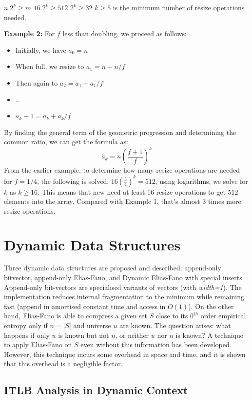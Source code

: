 \par
$ n.2^k \geq m$\newline
$ 16.2^k \geq 512$\newline
$2^k \geq 32$\newline
$k \geq 5$ is the minimum number of resize operations needed.
\par
\textbf{Example 2:} For $f$ less than doubling, we proceed as follows:
\begin{itemize}
    \item Initially, we have $a_0 = n$
    \item When full, we resize to $a_1 = n + n/f$
    \item Then again to $a_2 = a_1 + a_1/f$
    \item \ldots
    \item $a_k+1 = a_k + a_k/f$
\end{itemize}
By finding the general term of the geometric progression and determining the common ratio, we can get the formula as:
$$a_k = n(\frac{f+1}{f})^k$$
From the earlier example, to determine how many resize operations are needed for $f = 1/4$, the following is solved:
$16(\frac{5}{4})^k = 512$, using logarithms, we solve for $k$ as $k \geq 16$. This means that new need at least $16$ resize operations to get $512$ elements into the array. Compared with Example 1, that's almost 3 times more resize operations.
\FloatBarrier
\section{Dynamic Data Structures}
Three dynamic data structures are proposed and described: append-only bitvector, append-only Elias-Fano, and Dynamic Elias-Fano with special inserts. Append-only bit-vectors are specialised variants of vectors (with \textit{width=1}). The implementation reduces internal fragmentation to the minimum while remaining fast (append in amortised constant time and access in $O(1)$). On the other hand, Elias-Fano is able to compress a given set $S$ close to its $0^{th}$ order empirical entropy only if $n=|S|$ and universe $u$ are known. The question arises: what happens if only $u$ is known but not $n$, or neither $u$ nor $n$ is known? A technique to apply Elias-Fano on $S$ even without this information has been developed. However, this technique incurs some overhead in space and time, and it is shown that this overhead is a negligible factor.

\subsection{ITLB Analysis in Dynamic Context}
\label{sec:itlb-dynamic}

